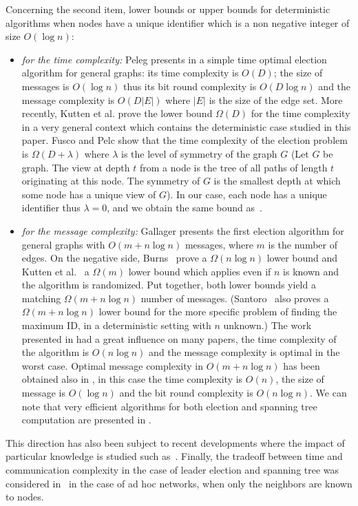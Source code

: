 \documentclass[11pt,envcountsame,letterpaper]{llncs}
\begin{document}
Concerning the second item, lower bounds or upper bounds for deterministic algorithms
when nodes have a unique identifier which is a non negative
integer of size $O(\log n)$:
\begin{itemize}
\item {\it for the time complexity:}
Peleg presents in \cite{Peleg90} a simple time optimal election algorithm
for general graphs: its time complexity is $O(D)$;
 the size of
messages is $O(\log n)$ thus its bit round complexity is
$O(D\log n)$ and the message complexity is $O(D|E|)$
where $|E|$ is the size of the edge set.
More recently, Kutten et al. \cite{KPPRT15}
prove the lower bound $\Omega(D)$ for the time
complexity in a very general context which contains the deterministic case
studied in this paper. Fusco and Pelc \cite{FP15} show that the 
time complexity
of the election problem is
$\Omega(D+\lambda)$ where $\lambda$ is the level of symmetry
of the graph $G$ (Let $G$ be graph. 
The view at depth $t$ from a node is the tree of all paths
of length $t$ originating at this node. The symmetry of $G$ is the
smallest depth at which some node has a unique view of $G$).
In our case, each node has  a unique identifier thus $\lambda=0$, and we obtain
the same bound as~\cite{KPPRT15}.
\item {\it for the message complexity:}
Gallager \cite{Gallager} presents the first election 
algorithm for general graphs with $O(m+n\log n)$ messages, 
where $m$ is the number of edges.
On the negative side, Burns~\cite{burns1980} prove a $\Omega(n\log n)$ lower bound and Kutten et al.~\cite{KPPRT15} a $\Omega(m)$ lower bound which applies even if $n$ is known and the algorithm is randomized. Put together, both lower bounds yield a matching $\Omega(m + n\log n)$ number of messages. (Santoro~\cite{Santoro84} also proves a $\Omega(m+n\log n)$ lower bound for the more specific problem of finding the maximum ID, in a deterministic setting with $n$ unknown.)
The work presented in \cite{GHS83} had a
great influence on many papers, the time complexity of the algorithm 
is $O(n\log n)$ and the message complexity is optimal  in the worst case.
Optimal message complexity in $O(m+n\log n)$ has been obtained 
also in \cite{Awer87}, in this case the time complexity is $O(n)$, the size 
of message is $O(\log n)$ and the
bit round complexity is $O(n\log n)$.
We can note that very efficient algorithms for both election
and spanning tree computation are presented in \cite{KKM90}.
\end{itemize}
This direction has also been subject to recent developments where the impact of particular knowledge is studied such as~\cite{DP16,GMP17,MP16}. Finally, the tradeoff between time and communication complexity in the case of leader election and spanning tree was considered in~\cite{KK13} in the case of ad hoc networks, when only the neighbors are known to nodes.
\end{document}
